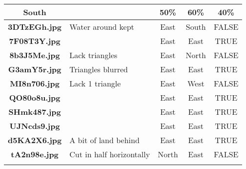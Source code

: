\documentclass{article}
\begin{document}
\begin{table}[h!]
{\begin{tabular}{|c|p{4cm}|c|c|c|}
            \rowcolor{gray!40}
            \textbf{South}       &                              & 50\%                          & 60\%                             & 40\%                 \\ \hline
            \rowcolor{gray!0}
            \textbf{3DTzEGh.jpg} & Water around kept            & East                          & South                            & FALSE                \\ \hline
            \rowcolor{gray!10}
            \textbf{7F08T3Y.jpg} &                              & East                          & East                             & TRUE                 \\ \hline
            \rowcolor{gray!0}
            \textbf{8b3J5Me.jpg} & Lack triangles               & East                          & North                            & FALSE                \\ \hline
            \rowcolor{gray!10}
            \textbf{G3amY5r.jpg} & Triangles blurred            & East                          & East                             & TRUE                 \\ \hline
            \rowcolor{gray!0}
            \textbf{MI8n706.jpg} & Lack 1 triangle              & East                          & West                             & FALSE                \\ \hline
            \rowcolor{gray!10}
            \textbf{QO80o8u.jpg} &                              & East                          & East                             & TRUE                 \\ \hline
            \rowcolor{gray!0}
            \textbf{SHmk487.jpg} &                              & East                          & East                             & TRUE                 \\ \hline
            \rowcolor{gray!10}
            \textbf{UJNcds9.jpg} &                              & East                          & East                             & TRUE                 \\ \hline
            \rowcolor{gray!0}
            \textbf{d5KA2X6.jpg} & A bit of land behind         & East                          & East                             & TRUE                 \\ \hline
            \rowcolor{gray!10}
            \textbf{tA2n98e.jpg} & Cut in half horizontally     & North                         & East                             & FALSE                \\ \hline
            \rowcolor{gray!40}

\end{tabular}}
\end{table}
\end{document}
